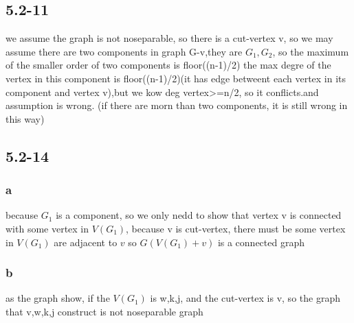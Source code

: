 \documentclass[a4paper,UTF8]{article}
\theoremstyle{definition}
\begin{document}
\subsection*{5.2-11}
we assume the graph is not noseparable, so there is a cut-vertex v, so we may assume there are two components in graph G-v,they are $G_1,G_2$, so the maximum of the smaller order of two components is floor((n-1)/2)
the max degre of the vertex in this component is   floor((n-1)/2)(it has edge betweent each vertex in its component and vertex v),but we kow deg vertex>=n/2, so it conflicts.and assumption is wrong.
(if there are morn than two components, it is still wrong in this way)

\subsection*{5.2-14}
\subsubsection{a}
because $G_1$ is a component, so we only  nedd to show that vertex v is connected with some vertex in $V(G_1)$, because v is cut-vertex, there must be some vertex in $V(G_1)$ are adjacent to $v$
so $G(V(G_1)+v)$ is a connected graph
\subsubsection*{b}
as the graph show, if the $V(G_1)$ is w,k,j, and the cut-vertex is v, so the graph that v,w,k,j construct is not noseparable graph
\end{document}
